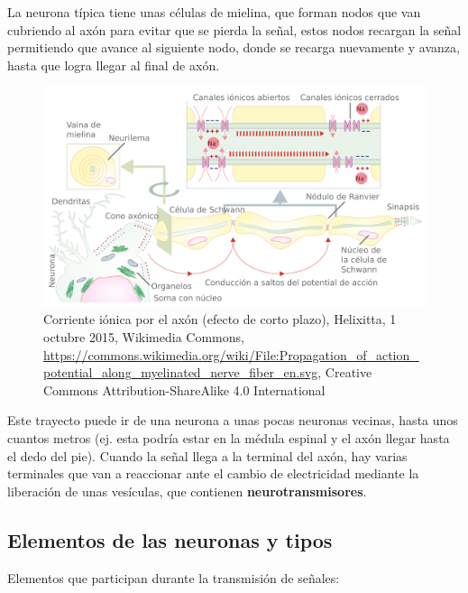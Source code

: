 La neurona típica tiene unas células de mielina, que forman nodos que van cubriendo al axón para evitar que se pierda la señal, estos nodos recargan la señal permitiendo que avance al siguiente nodo, donde se recarga nuevamente y avanza, hasta que logra llegar al final de axón.


\begin{figure}[h]
 \centering
 \includegraphics[scale=0.15]{../Figuras/Saltos.png}
 \caption{Corriente iónica por el axón (efecto de corto plazo), Helixitta, 1 octubre 2015, Wikimedia Commons, \url{https://commons.wikimedia.org/wiki/File:Propagation_of_action_potential_along_myelinated_nerve_fiber_en.svg}, Creative Commons Attribution-ShareAlike 4.0 International}
 \label{fig:conduccionSaltos}
\end{figure}


Este trayecto puede ir de una neurona a unas pocas neuronas vecinas, hasta unos cuantos metros (ej. esta podría estar en la médula espinal y el axón llegar hasta el dedo del pie). Cuando la señal llega a la terminal del axón, hay varias terminales que van a reaccionar ante el cambio de electricidad mediante la liberación de unas vesículas, que contienen \textbf{neurotransmisores}.




\subsection{Elementos de las neuronas y tipos}


Elementos que participan durante la transmisión de señales:


